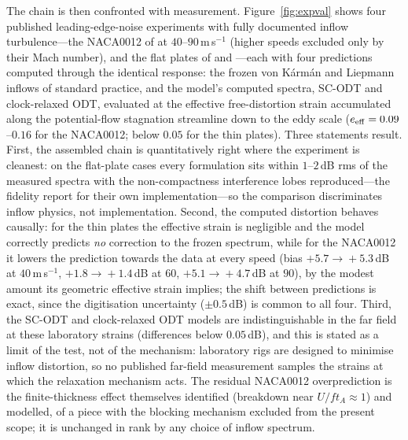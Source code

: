 \documentclass[lineno]{JFM-FLM_Au}
\begin{document}
The chain is then confronted with measurement.
Figure~\ref{fig:expval} shows four published leading-edge-noise
experiments with fully documented inflow turbulence---the NACA0012 of
\citet{PatersonAmiet1976} at $40$--$90$\,m\,s$^{-1}$ (higher speeds
excluded only by their Mach number), and the flat plates of
\citet{Bampanis2022} and \citet{Narayanan2015}---each with four
predictions computed through the identical response: the frozen
von K\'arm\'an and Liepmann inflows of standard practice, and the
model's computed spectra, SC-ODT and clock-relaxed ODT, evaluated at the
effective free-distortion strain accumulated along the potential-flow
stagnation streamline down to the eddy scale ($e_{\rm eff}=0.09$--$0.16$
for the NACA0012; below $0.05$ for the thin plates). Three statements
result. First, the assembled chain is quantitatively right where the
experiment is cleanest: on the flat-plate cases every formulation sits
within $1$--$2$\,dB rms of the measured spectra with the
non-compactness interference lobes reproduced---the fidelity
\citet{Bampanis2022} report for their own implementation---so the
comparison discriminates inflow physics, not implementation. Second,
the computed distortion behaves causally: for the thin plates the
effective strain is negligible and the model correctly predicts
\emph{no} correction to the frozen spectrum, while for the NACA0012 it
lowers the prediction towards the data at every speed
(bias $+5.7\!\to\!+5.3$\,dB at $40$\,m\,s$^{-1}$,
$+1.8\!\to\!+1.4$\,dB at $60$, $+5.1\!\to\!+4.7$\,dB at $90$), by the
modest amount its geometric effective strain implies; the shift
between predictions is exact, since the digitisation uncertainty
($\pm0.5$\,dB) is common to all four. Third, the
SC-ODT and clock-relaxed ODT models are indistinguishable in the far
field at these laboratory strains (differences below $0.05$\,dB),
and this is stated as a limit of the test, not of the mechanism:
laboratory rigs are designed to minimise inflow distortion, so no
published far-field measurement samples the strains at which the
relaxation mechanism acts. The residual NACA0012 overprediction is
the finite-thickness effect \citet{PatersonAmiet1976} themselves
identified (breakdown near $U/f t_A\approx1$) and
\citet{Gershfeld2004} modelled, of a piece with the blocking mechanism
excluded from the present scope; it is unchanged in rank by any choice
of inflow spectrum.
\end{document}
